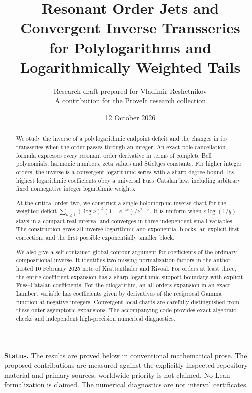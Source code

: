 \documentclass[11pt,a4paper]{article}
\title{\color{inkblue}\bfseries Resonant Order Jets and\\
Convergent Inverse Transseries\\[4pt]
\large for Polylogarithms and Logarithmically Weighted Tails}
\author{Research draft prepared for Vladimir Reshetnikov\\
\small A contribution for the ProveIt research collection}
\date{12 October 2026}
\numberwithin{equation}{section}
\theoremstyle{definition}
\theoremstyle{remark}
\newcommand{\eps}{\varepsilon}
\begin{document}
\maketitle
\begin{abstract}
We study the inverse of a polylogarithmic endpoint deficit and the changes
in its transseries when the order passes through an integer.  An exact
pole-cancellation formula expresses every resonant order derivative in
terms of complete Bell polynomials, harmonic numbers, zeta values and
Stieltjes constants.  For higher integer orders, the inverse is a
convergent logarithmic series with a sharp degree bound.  Its highest
logarithmic coefficients obey a universal Fuss--Catalan law, including
arbitrary fixed nonnegative integer logarithmic weights.

At the critical order two, we construct a single holomorphic inverse
chart for the weighted deficit
\(\sum_{\nu\ge1}(\log\nu)^k(1-e^{-\nu t})/\nu^{2+\eps}\).
It is uniform when \(\eps\log(1/y)\) stays in a compact real interval and
converges in three independent small variables.  The construction gives
all inverse-logarithmic and exponential blocks, an explicit first
correction, and the first possible exponentially smaller block.

We also give a self-contained global contour argument for coefficients
of the ordinary compositional inverse.  It identifies two missing
normalization factors in the author-hosted 10 February 2025 note of
Krattenthaler and Rivoal.  For orders at least three, the entire
coefficient expansion has a sharp logarithmic support boundary with
explicit Fuss--Catalan coefficients.  For the dilogarithm, an all-orders
expansion in an exact Lambert variable has coefficients given by
derivatives of the reciprocal Gamma function at negative integers.
Convergent local charts are carefully distinguished from these outer
asymptotic expansions.  The accompanying code provides exact algebraic
checks and independent high-precision numerical diagnostics.
\end{abstract}

\noindent\textbf{Status.}
The results are proved below in conventional mathematical prose.
The proposed contributions are measured against the explicitly inspected
repository material and primary sources; worldwide priority is not
claimed.  No Lean formalization is claimed.  The numerical diagnostics
are not interval certificates.

\clearpage
\begingroup
\small
\setlength{\parskip}{0pt}
\tableofcontents
\endgroup
\newpage
\end{document}
